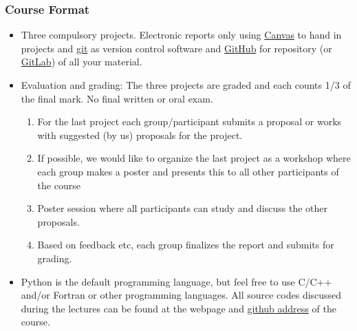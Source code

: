 \documentclass{beamer}
\begin{document}
\begin{frame}
\frametitle{Course Format}

\begin{block}{}
\begin{itemize}
  \item Three compulsory projects. Electronic reports only using \href{{https://www.uio.no/english/services/it/education/canvas/}}{Canvas} to hand in projects and \href{{https://git-scm.com/}}{git} as version control software and \href{{https://github.com/}}{GitHub} for repository (or \href{{https://about.gitlab.com/}}{GitLab}) of all your material.

  \item Evaluation and grading: The three projects are graded and each counts 1/3 of the final mark. No final written or oral exam.
\begin{enumerate}

   \item For the last project each group/participant submits a proposal or works with suggested (by us) proposals for the project.

   \item If possible, we would like to organize the last project as a workshop where each group makes a poster and presents this to all other participants of the course

   \item Poster session where all participants can study and discuss the other proposals.

   \item Based on feedback etc, each group finalizes the report and submits for grading. 

\end{enumerate}

\noindent
  \item Python is the default programming language, but feel free to use C/C++ and/or Fortran or other programming languages. All source codes discussed during the lectures can be found at the webpage and \href{{https://github.com/CompPhysics/MachineLearning/tree/master/doc/Programs}}{github address} of the course. 
\end{itemize}

\noindent
\end{block}
\end{frame}
\end{document}
